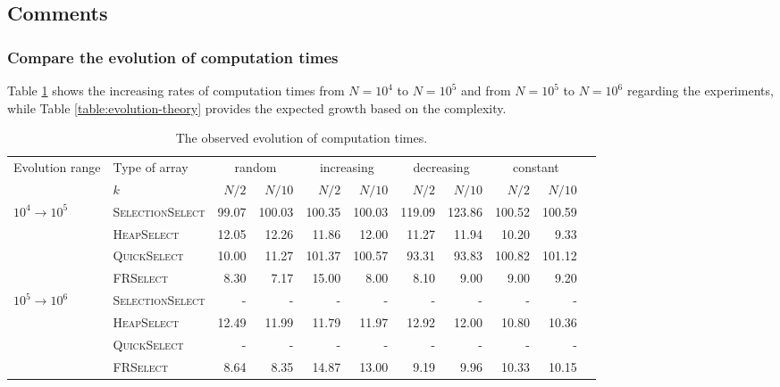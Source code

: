 \documentclass[acmconf,nonacm=true]{acmart}
\begin{document}
\subsection{Comments} \label{comment}

\subsubsection{Compare the evolution of computation times} \label{sec:comment-a}

Table \ref{table:evolution-observation} shows the increasing rates of computation times from $N=10^4$ to $N=10^5$ and from $N=10^5$ to $N=10^6$ regarding the experiments, while Table \ref{table:evolution-theory} provides the expected growth based on the complexity. 

\begin{table}[h!]
    \centering
    \footnotesize
    \caption{The observed evolution of computation times.}
    \label{table:evolution-observation}
    \begin{tabular}{llrrrrrrrrr}
        \toprule
        Evolution range & {Type of array} & \multicolumn{2}{c}{{random}} & \multicolumn{2}{c}{{increasing}} & \multicolumn{2}{c}{{decreasing}} & \multicolumn{2}{c}{{constant}} \\
        \cmidrule(r){3-4} \cmidrule(lr){5-6} \cmidrule(lr){7-8} \cmidrule(l){9-10}
        & $k$ & $N/2$ & $N/10$ & $N/2$ & $N/10$ & $N/2$ & $N/10$ & $N/2$ & $N/10$ \\
        \midrule
        $10^4 \to 10^5$ & \textsc{SelectionSelect} & 99.07 & 100.03 & 100.35 & 100.03 & 119.09 & 123.86 & 100.52 & 100.59 \\
        & \textsc{HeapSelect} & 12.05 & 12.26 & 11.86 & 12.00 & 11.27 & 11.94 & 10.20 & 9.33 \\
        & \textsc{QuickSelect} & 10.00 & 11.27 & 101.37 & 100.57 & 93.31 & 93.83 & 100.82 & 101.12 \\
        & \textsc{FRSelect} & 8.30 & 7.17 & 15.00 & 8.00 & 8.10 & 9.00 & 9.00 & 9.20 \\
             \midrule
        $10^5 \to 10^6$ & \textsc{SelectionSelect} & - & - & - & - & - & - & - & - \\
        & \textsc{HeapSelect} & 12.49 & 11.99 & 11.79 & 11.97 & 12.92 & 12.00 & 10.80 & 10.36 \\
        & \textsc{QuickSelect} & - & - & - & - & - & - & - & - \\
        & \textsc{FRSelect} & 8.64 & 8.35 & 14.87 & 13.00 & 9.19 & 9.96 & 10.33 & 10.15 \\      
        \bottomrule
    \end{tabular}
\end{table}
\end{document}
